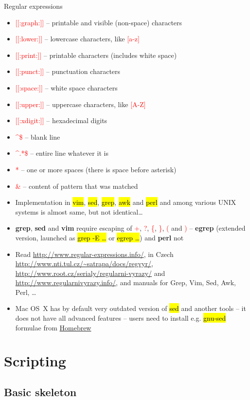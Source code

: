 \documentclass[compress, ucs, xelatex, 11pt, xcolor=svgnames,
  hyperref={
    bookmarks=true,
    unicode=true,
    colorlinks=true,
    pdftitle={Linux, command line and MetaCentrum},
    plainpages=false,
    pdfauthor={Vojtech Zeisek},
    pdfsubject={Course about use of Linux command line, writing shell scripts and using MetaCentrum of CESNET},
    pdfcreator={XeLaTeX},
    pdfkeywords={Linux, GNU, BASH, shell, command line, MetaCentrum},
    linkcolor=Red,
    anchorcolor=Blue,
    citecolor=Purple,
    filecolor=DodgerBlue,
    menucolor=DarkOrchid,
    urlcolor=DeepSkyBlue,
    pdftex},
  url={hyphens, lowtilde} %
  ]{beamer}
\renewcommand{\texttt}[1]{\hl{\ttfamily #1}}
\renewcommand{\alert}[1]{\textcolor{red}{#1}}
\begin{document}
\begin{frame}[allowframebreaks]{Regular expressions}
\begin{itemize}
  \item \alert{[[:graph:]]} -- printable and visible (non-space) characters
  \item \alert{[[:lower:]]} -- lowercase characters, like \alert{[a-z]}
  \item \alert{[[:print:]]} -- printable characters (includes white space)
  \item \alert{[[:punct:]]} -- punctuation characters
  \item \alert{[[:space:]]} -- white space characters
  \item \alert{[[:upper:]]} -- uppercase characters, like \alert{[A-Z]}
  \item \alert{[[:xdigit:]]} -- hexadecimal digits
  \item \alert{\textasciicircum\$} -- blank line
  \item \alert{\textasciicircum.*\$} -- entire line whatever it is
  \item \alert{ *} -- one or more spaces (there is space before asterisk)
  \item \alert{\&} -- content of pattern that was matched
  \item Implementation in \texttt{vim}, \texttt{sed}, \texttt{grep}, \texttt{awk} and \texttt{perl} and among various UNIX systems is almost same, but not identical\ldots
  \item \textbf{grep}, \textbf{sed} and \textbf{vim} require escaping of \alert{+}, \alert{?}, \alert{\{}, \alert{\}}, \alert{(} and \alert{)} -- \textbf{egrep} (extended version, launched as \texttt{grep -E \ldots} or \texttt{egrep \ldots}) and \textbf{perl} not
  \item Read \url{http://www.regular-expressions.info/}, in Czech \url{http://www.nti.tul.cz/~satrapa/docs/regvyr/}, \url{http://www.root.cz/serialy/regularni-vyrazy/} and \url{http://www.regularnivyrazy.info/}, and manuals for Grep, Vim, Sed, Awk, Perl, \ldots
  \item Mac OS~X has by default very outdated version of \texttt{sed} and another tools -- it does not have all advanced features -- users need to install e.g. \texttt{gnu-sed} formulae from \href{http://brew.sh/}{Homebrew}
\end{itemize}
\end{frame}

\section{Scripting}

\subsection{Basic skeleton}
\end{document}
